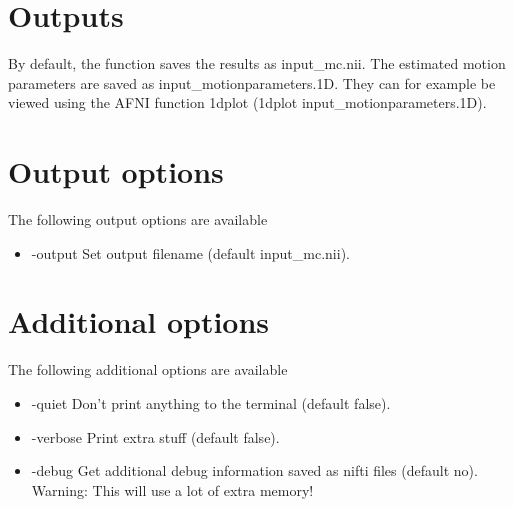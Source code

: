 \section{Outputs}

By default, the function saves the results as input\_mc.nii. The estimated motion parameters are saved as input\_motionparameters.1D. They can for example be viewed using the AFNI function 1dplot (1dplot input\_motionparameters.1D).

\section{Output options}

The following output options are available

\begin{itemize}

\item -output 
\newline \newline Set output filename (default input\_mc.nii). 

\end{itemize}

\section{Additional options}

The following additional options are available

\begin{itemize}

\item -quiet 
\newline \newline Don't print anything to the terminal (default false). 

\item -verbose
\newline \newline Print extra stuff (default false).
 
\item -debug 
\newline \newline Get additional debug information saved as nifti files (default no). Warning: This will use a lot of extra memory! 

\end{itemize}


